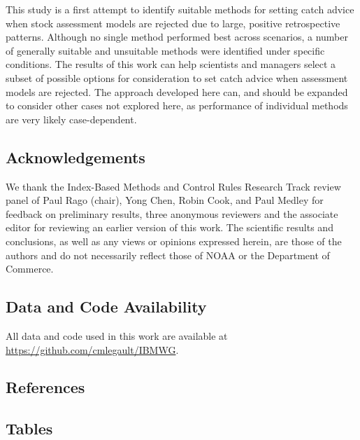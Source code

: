 \documentclass[
  12pt,
]{article}
\newlength{\cslhangindent}
\newlength{\cslentryspacingunit} %
\newenvironment{CSLReferences}[2] %
 {%
  \setlength{\parindent}{0pt}
  \ifodd #1
  \let\oldpar\par
  \def\par{\hangindent=\cslhangindent\oldpar}
  \fi
  \setlength{\parskip}{#2\cslentryspacingunit}
 }%
 {}
\begin{document}
This study is a first attempt to identify suitable methods for setting catch advice when stock assessment models are rejected due to large, positive retrospective patterns. Although no single method performed best across scenarios, a number of generally suitable and unsuitable methods were identified under specific conditions. The results of this work can help scientists and managers select a subset of possible options for consideration to set catch advice when assessment models are rejected. The approach developed here can, and should be expanded to consider other cases not explored here, as performance of individual methods are very likely case-dependent.

\hypertarget{acknowledgements}{%
\subsection{Acknowledgements}\label{acknowledgements}}

We thank the Index-Based Methods and Control Rules Research Track review panel of Paul Rago (chair), Yong Chen, Robin Cook, and Paul Medley for feedback on preliminary results, three anonymous reviewers and the associate editor for reviewing an earlier version of this work. The scientific results and conclusions, as well as any views or opinions expressed herein, are those of the authors and do not necessarily reflect those of NOAA or the Department of Commerce.

\hypertarget{data-and-code-availability}{%
\subsection{Data and Code Availability}\label{data-and-code-availability}}

All data and code used in this work are available at \url{https://github.com/cmlegault/IBMWG}.

\hypertarget{references}{%
\subsection{References}\label{references}}

\hypertarget{refs}{}
\begin{CSLReferences}{0}{0}
\end{CSLReferences}

\pagebreak

\hypertarget{tables}{%
\subsection{Tables}\label{tables}}
\end{document}

